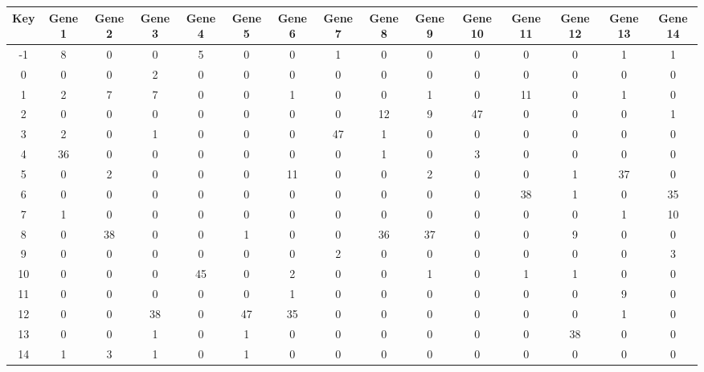 \begin{tabular}{|c|c|c|c|c|c|c|c|c|c|c|c|c|c|c|}
\hline
Key & Gene 1 & Gene 2 & Gene 3 & Gene 4 & Gene 5 & Gene 6 & Gene 7 & Gene 8 & Gene 9 & Gene 10 & Gene 11 & Gene 12 & Gene 13 & Gene 14 \\
\hline
-1 & 8 & 0 & 0 & 5 & 0 & 0 & 1 & 0 & 0 & 0 & 0 & 0 & 1 & 1 \\
0 & 0 & 0 & 2 & 0 & 0 & 0 & 0 & 0 & 0 & 0 & 0 & 0 & 0 & 0 \\
1 & 2 & 7 & 7 & 0 & 0 & 1 & 0 & 0 & 1 & 0 & 11 & 0 & 1 & 0 \\
2 & 0 & 0 & 0 & 0 & 0 & 0 & 0 & 12 & 9 & 47 & 0 & 0 & 0 & 1 \\
3 & 2 & 0 & 1 & 0 & 0 & 0 & 47 & 1 & 0 & 0 & 0 & 0 & 0 & 0 \\
4 & 36 & 0 & 0 & 0 & 0 & 0 & 0 & 1 & 0 & 3 & 0 & 0 & 0 & 0 \\
5 & 0 & 2 & 0 & 0 & 0 & 11 & 0 & 0 & 2 & 0 & 0 & 1 & 37 & 0 \\
6 & 0 & 0 & 0 & 0 & 0 & 0 & 0 & 0 & 0 & 0 & 38 & 1 & 0 & 35 \\
7 & 1 & 0 & 0 & 0 & 0 & 0 & 0 & 0 & 0 & 0 & 0 & 0 & 1 & 10 \\
8 & 0 & 38 & 0 & 0 & 1 & 0 & 0 & 36 & 37 & 0 & 0 & 9 & 0 & 0 \\
9 & 0 & 0 & 0 & 0 & 0 & 0 & 2 & 0 & 0 & 0 & 0 & 0 & 0 & 3 \\
10 & 0 & 0 & 0 & 45 & 0 & 2 & 0 & 0 & 1 & 0 & 1 & 1 & 0 & 0 \\
11 & 0 & 0 & 0 & 0 & 0 & 1 & 0 & 0 & 0 & 0 & 0 & 0 & 9 & 0 \\
12 & 0 & 0 & 38 & 0 & 47 & 35 & 0 & 0 & 0 & 0 & 0 & 0 & 1 & 0 \\
13 & 0 & 0 & 1 & 0 & 1 & 0 & 0 & 0 & 0 & 0 & 0 & 38 & 0 & 0 \\
14 & 1 & 3 & 1 & 0 & 1 & 0 & 0 & 0 & 0 & 0 & 0 & 0 & 0 & 0 \\
\hline
\end{tabular}
